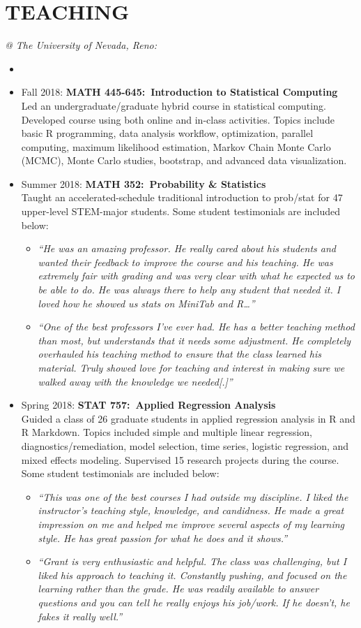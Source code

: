 \documentclass[paper=a4,fontsize=11pt]{scrartcl} %
\newcommand{\NewPart}[2]{\section*{\uppercase{#1} #2 }}
\newcommand{\CourseEntry}[3]{
		\noindent \item{#1: \textbf{#2} \\ #3}}
\begin{document}
\NewPart{Teaching}{}
\vspace{-7pt}
\textit{@ The University of Nevada, Reno:}
\begin{itemize}[noitemsep]
\item[]
\vspace{-15pt}

\CourseEntry{Fall 2018}{MATH 445-645:~Introduction to Statistical Computing}{Led an undergraduate/graduate hybrid course in statistical computing. Developed course using both online and in-class activities. Topics include basic R programming, data analysis workflow, optimization, parallel computing, maximum likelihood estimation, Markov Chain Monte Carlo (MCMC), Monte Carlo studies, bootstrap, and advanced data visualization.}{} 

\CourseEntry{Summer 2018}{MATH 352:~Probability \& Statistics}{Taught an accelerated-schedule traditional introduction to prob/stat for 47 upper-level STEM-major students. Some student testimonials are included below:
\begin{itemize}
\item \emph{\small{``He was an amazing professor. He really cared about his students and wanted their feedback to improve the course and his teaching. He
was extremely fair with grading and was very clear with what he expected us to be able to do. He was always there to help any student that needed it. I loved how he showed us stats on MiniTab and R\ldots''}}
\item \emph{\small{``One of the best professors I've ever had. He has a better teaching method than most, but understands that it needs some adjustment.
He completely overhauled his teaching method to ensure that the class learned his material. Truly showed love for teaching and
interest in making sure we walked away with the knowledge we needed[.]''}}
\end{itemize}
}{} 

\CourseEntry{Spring 2018}{STAT 757:~Applied Regression Analysis}{Guided a class of 26 graduate students in applied regression analysis in R and R Markdown. Topics included simple and multiple linear regression, diagnostics/remediation, model selection, time series, logistic regression, and mixed effects modeling. Supervised 15 research projects during the course. Some student testimonials are included below:
\begin{itemize}
\item \emph{\small{``This was one of the best courses I had outside my discipline. I liked the instructor's teaching style, knowledge, and candidness. He made a great impression on me and helped me improve several aspects of my learning style. He has great passion for what he does and it shows.''}}
\item \emph{\small{``Grant is very enthusiastic and helpful. The class was challenging, but I liked his approach to teaching it. Constantly pushing, and focused
on the learning rather than the grade. He was readily available to answer questions and you can tell he really enjoys his job/work. If he doesn't, he fakes it really well.''}}
\end{itemize}
}{} 


\end{itemize}
\end{document}
